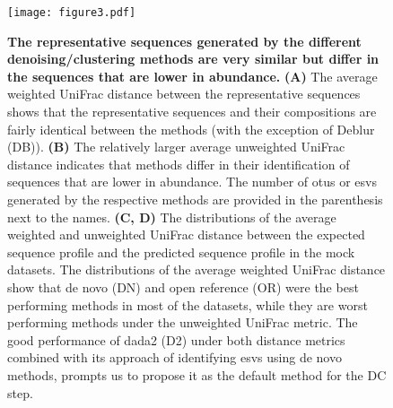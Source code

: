  \begin{figure}[H]
    \centering
    \texttt{[image: figure3.pdf]}
  \end{figure}
  \begin{figure}[H]
    \centering
    \caption{
      \textbf{The representative sequences generated by the different denoising/clustering methods are very similar but differ in the sequences that are lower in abundance.}
      \textbf{(A)} The average weighted UniFrac distance between the representative sequences shows that the representative sequences and their compositions are fairly identical between the methods (with the exception of Deblur (DB)).
      \textbf{(B)} The relatively larger average unweighted UniFrac distance indicates that methods differ in their identification of sequences that are lower in abundance.
      The number of \ac{otu}s or \ac{esv}s generated by the respective methods are provided in the parenthesis next to the names.
      \textbf{(C, D)} The distributions of the average weighted and unweighted UniFrac distance between the expected sequence profile and the predicted sequence profile in the mock datasets.
      The distributions of the average weighted UniFrac distance show that de novo (DN) and open reference (OR) were the best performing methods in most of the datasets, while they are worst performing methods under the unweighted UniFrac metric.
      The good performance of dada2 (D2) under both distance metrics combined with its approach of identifying \ac{esv}s using de novo methods, prompts us to propose it as the default method for the DC step.
    }
    \label{fig:figure3}
  \end{figure}
  \FloatBarrier
  \newpage

